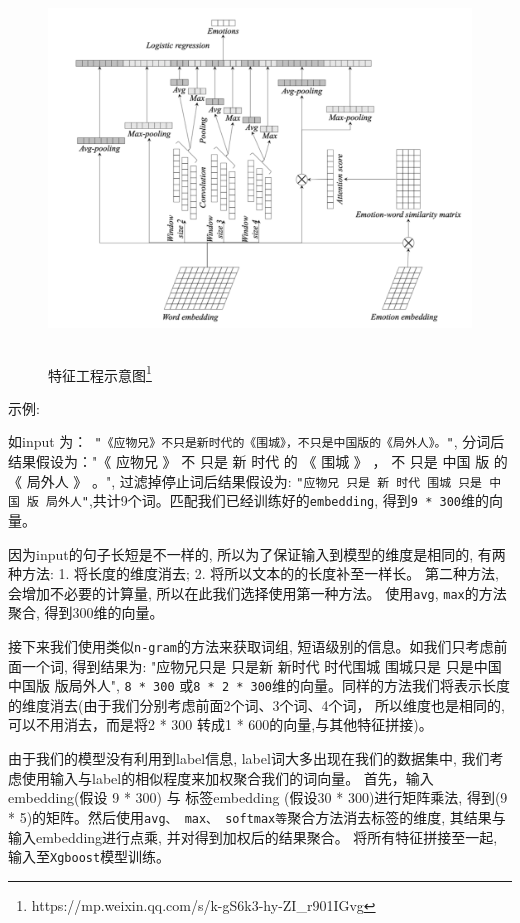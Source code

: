 \begin{figure}[ht]
 \centering
 \includegraphics[height=10cm]{images/book_task1_feature_word.jpg}
 \caption{特征工程示意图\footnote{https://mp.weixin.qq.com/s/k-gS6k3-hy-ZI_r901IGvg}}
 \label{fig:book_task1_feature_word}
\end{figure}

\noindent 示例:

如input 为：\texttt{ "《应物兄》不只是新时代的《围城》，不只是中国版的《局外人》。"}, 分词后结果假设为："《 应物兄 》 不 只是 新 时代 的 《 围城 》 ， 不 只是 中国 版 的 《 局外人 》 。", 过滤掉停止词后结果假设为: \texttt{"应物兄 只是 新 时代 围城 只是 中国 版 局外人"},共计9个词。匹配我们已经训练好的\texttt{embedding}, 得到\texttt{9 * 300}维的向量。

因为input的句子长短是不一样的, 所以为了保证输入到模型的维度是相同的, 有两种方法: 1. 将长度的维度消去; 2. 将所以文本的的长度补至一样长。 第二种方法, 会增加不必要的计算量, 所以在此我们选择使用第一种方法。 使用\texttt{avg}, \texttt{max}的方法聚合, 得到300维的向量。

接下来我们使用类似\texttt{n-gram}的方法来获取词组, 短语级别的信息。如我们只考虑前面一个词, 得到结果为: "应物兄只是 只是新 新时代 时代围城 围城只是 只是中国 中国版 版局外人", \texttt{8 * 300} 或\texttt{8 * 2 * 300}维的向量。同样的方法我们将表示长度的维度消去(由于我们分别考虑前面2个词、3个词、4个词， 所以维度也是相同的, 可以不用消去，而是将2 * 300 转成1 * 600的向量,与其他特征拼接)。

由于我们的模型没有利用到label信息, label词大多出现在我们的数据集中, 我们考虑使用输入与label的相似程度来加权聚合我们的词向量。 首先，输入embedding(假设 9 * 300) 与 标签embedding (假设30 * 300)进行矩阵乘法, 得到(9 * 5)的矩阵。然后使用\texttt{avg、 max、 softmax等}聚合方法消去标签的维度, 其结果与输入embedding进行点乘, 并对得到加权后的结果聚合。 将所有特征拼接至一起,  输入至\texttt{Xgboost}模型训练。\\

